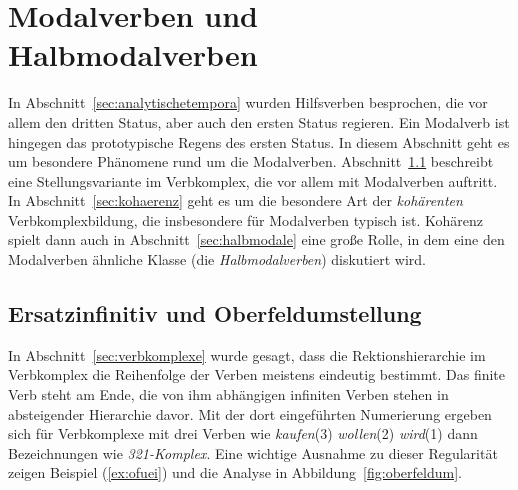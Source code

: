 \begin{exe}
  \ex\label{ex:prd3295} 
  \begin{xlist}
  \end{xlist}
\end{exe}

\Enl[2]
\Unstretch



\section{Modalverben und Halbmodalverben}

In Abschnitt~\ref{sec:analytischetempora} wurden Hilfsverben besprochen, die vor allem den dritten Status, aber auch den ersten Status regieren.
Ein Modalverb ist hingegen das prototypische Regens des ersten Status.
In diesem Abschnitt geht es um besondere Phänomene rund um die Modalverben.
Abschnitt~\ref{sec:ersiofu} beschreibt eine Stellungsvariante im Verbkomplex, die vor allem mit Modalverben auftritt.
In Abschnitt~\ref{sec:kohaerenz} geht es um die besondere Art der \textit{kohärenten} Verbkomplexbildung, die insbesondere für Modalverben typisch ist.
Kohärenz spielt dann auch in Abschnitt~\ref{sec:halbmodale} eine große Rolle, in dem eine den Modalverben ähnliche Klasse (die \textit{Halbmodalverben}) diskutiert wird.

\label{sec:modalverbkonstruktionen}

\subsection{Ersatzinfinitiv und Oberfeldumstellung}

\label{sec:ersiofu}


In Abschnitt~\ref{sec:verbkomplexe} wurde gesagt, dass die Rektionshierarchie im Verbkomplex die Reihenfolge der Verben meistens eindeutig bestimmt.
Das finite Verb steht am Ende, die von ihm abhängigen infiniten Verben stehen in absteigender Hierarchie davor.
Mit der dort eingeführten Numerierung ergeben sich für Verbkomplexe mit drei Verben wie \textit{kaufen}(3) \textit{wollen}(2) \textit{wird}(1) dann Bezeichnungen wie \textit{321-Komplex}.
Eine wichtige Ausnahme zu dieser Regularität zeigen Beispiel (\ref{ex:ofuei}) und die Analyse in Abbildung~\ref{fig:oberfeldum}.

